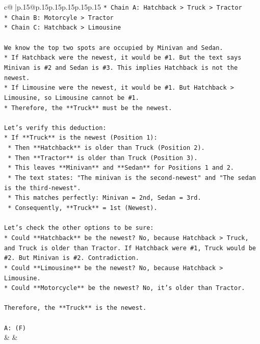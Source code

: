 \documentclass{article}
\begin{document}
{\begin{supertabular}{c@{$\;$}|p{.15\linewidth}@{}p{.15\linewidth}p{.15\linewidth}p{.15\linewidth}p{.15\linewidth}p{.15\linewidth}}
{{{\texttt{*   Chain A: Hatchback > Truck > Tractor} \\
\texttt{*   Chain B: Motorcyle > Tractor} \\
\texttt{*   Chain C: Hatchback > Limousine} \\
\\ 
\texttt{We know the top two spots are occupied by Minivan and Sedan.} \\
\texttt{*   If Hatchback were the newest, it would be \#1. But the text says Minivan is \#2 and Sedan is \#3. This implies Hatchback is not the newest.} \\
\texttt{*   If Limousine were the newest, it would be \#1. But Hatchback > Limousine, so Limousine cannot be \#1.} \\
\texttt{*   Therefore, the **Truck** must be the newest.} \\
\\ 
\texttt{Let's verify this deduction:} \\
\texttt{*   If **Truck** is the newest (Position 1):} \\
\texttt{    *   Then **Hatchback** is older than Truck (Position 2).} \\
\texttt{    *   Then **Tractor** is older than Truck (Position 3).} \\
\texttt{    *   This leaves **Minivan** and **Sedan** for Positions 1 and 2.} \\
\texttt{    *   The text states: "The minivan is the second{-}newest" and "The sedan is the third{-}newest".} \\
\texttt{    *   This matches perfectly: Minivan = 2nd, Sedan = 3rd.} \\
\texttt{    *   Consequently, **Truck** = 1st (Newest).} \\
\\ 
\texttt{Let's check the other options to be sure:} \\
\texttt{*   Could **Hatchback** be the newest? No, because Hatchback > Truck, and Truck is older than Tractor. If Hatchback were \#1, Truck would be \#2. But Minivan is \#2. Contradiction.} \\
\texttt{*   Could **Limousine** be the newest? No, because Hatchback > Limousine.} \\
\texttt{*   Could **Motorcycle** be the newest? No, it's older than Tractor.} \\
\\ 
\texttt{Therefore, the **Truck** is the newest.} \\
\\ 
\texttt{A: (F)} \\
            }
        }
    }
    & & \\ \\


\end{supertabular}}
\end{document}
